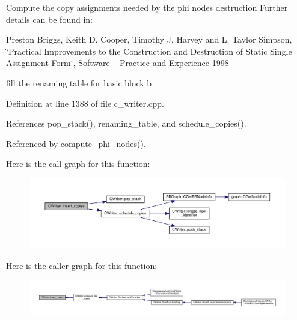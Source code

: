 Compute the copy assignments needed by the phi nodes destruction Further details can be found in\+: 


\begin{DoxyItemize}
\item Preston Briggs, Keith D. Cooper, Timothy J. Harvey and L. Taylor Simpson, \char`\"{}\+Practical Improvements to the Construction and Destruction of Static Single Assignment Form\char`\"{}, Software -- Practice and Experience 1998 
\end{DoxyItemize}fill the renaming table for basic block b 

Definition at line 1388 of file c\+\_\+writer.\+cpp.



References pop\+\_\+stack(), renaming\+\_\+table, and schedule\+\_\+copies().



Referenced by compute\+\_\+phi\+\_\+nodes().

Here is the call graph for this function\+:
\nopagebreak
\begin{figure}[H]
\begin{center}
\leavevmode
\includegraphics[width=350pt]{d3/d59/classCWriter_ad9cb6bbf514295637f24b12e35af9939_cgraph}
\end{center}
\end{figure}
Here is the caller graph for this function\+:
\nopagebreak
\begin{figure}[H]
\begin{center}
\leavevmode
\includegraphics[width=350pt]{d3/d59/classCWriter_ad9cb6bbf514295637f24b12e35af9939_icgraph}
\end{center}
\end{figure}
\mbox{\label{classCWriter_ab9ea6f81d49ce7fed0fa00ffc7e19219}} 
